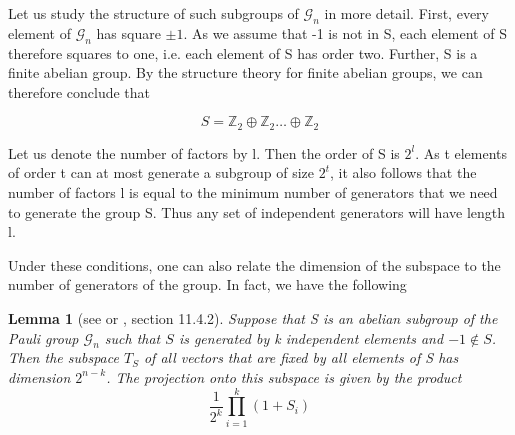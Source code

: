 \documentclass[a4paper, draft]{article}
\theoremstyle{own}
\newtheorem{lem}[thm]{Lemma}
\theoremstyle{remark}
\newcommand{\Z}{\mathbb{Z}}
\begin{document}
Let us study the structure of such subgroups of $\mathcal{G}_n$ in more detail. First, every element of $\mathcal{G}_n$ has square $\pm 1$. As we assume that -1 is not in S, each element of S therefore squares to one, i.e. each element of S has order two. Further, S is a finite abelian group. By the structure theory for finite abelian groups, we can therefore conclude that 

$$
S = {\Z}_2  \oplus \Z_2 \dots \oplus \Z_2
$$

Let us denote the number of factors by l. Then the order of S is $2^l$. As t elements of order t can at most generate a subgroup of size $2^t$, it also follows that the number of factors l is equal to the minimum number of generators that we need to generate the group S. Thus any set of independent generators will have length l. 

Under these conditions, one can also relate the dimension of the subspace to the number of generators of the group. In fact, we have the following

\begin{lem}[see \cite{G2} or \cite{RieffelPolak}, section 11.4.2]\label{lem:stabilizerdimension}
Suppose that S is an abelian subgroup of the Pauli group $\mathcal{G}_n$ such that $S$ is generated by k independent elements and $-1 \notin S$. Then the subspace $T_S$ of all vectors that are fixed by all elements of S has dimension $2^{n-k}$.  The projection onto this subspace is given by the product
$$
\frac{1}{2^k} \prod_{i=1}^k (1 + S_i)
$$
\end{lem}
\end{document}
